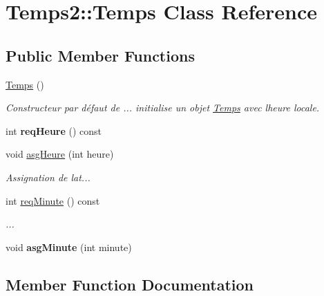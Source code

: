 \hypertarget{classTemps2_1_1Temps}{}\section{Temps2\+:\+:Temps Class Reference}
\label{classTemps2_1_1Temps}
\subsection*{Public Member Functions}
\begin{DoxyCompactItemize}
\item 
\hyperlink{classTemps2_1_1Temps_afa08c90e00b7d4dd11a3b1181cedc5ff}{Temps} ()\hypertarget{classTemps2_1_1Temps_afa08c90e00b7d4dd11a3b1181cedc5ff}{}\label{classTemps2_1_1Temps_afa08c90e00b7d4dd11a3b1181cedc5ff}

\begin{DoxyCompactList}\small\item\em Constructeur par défaut de ... initialise un objet \hyperlink{classTemps2_1_1Temps}{Temps} avec l\textquotesingle{}heure locale. \end{DoxyCompactList}\item 
int {\bfseries req\+Heure} () const \hypertarget{classTemps2_1_1Temps_a58791986c9b433a65c80f95670d343f1}{}\label{classTemps2_1_1Temps_a58791986c9b433a65c80f95670d343f1}

\item 
void \hyperlink{classTemps2_1_1Temps_ab531fcca13f7f57c127c8fa37d638260}{asg\+Heure} (int heure)
\begin{DoxyCompactList}\small\item\em Assignation de l\textquotesingle{}at... \end{DoxyCompactList}\item 
int \hyperlink{classTemps2_1_1Temps_a6bf20b459c37dac7923e2cb2056e83da}{req\+Minute} () const 
\begin{DoxyCompactList}\small\item\em ... \end{DoxyCompactList}\item 
void {\bfseries asg\+Minute} (int minute)\hypertarget{classTemps2_1_1Temps_ab95238cbf2ee4eb7c9a832907d03534d}{}\label{classTemps2_1_1Temps_ab95238cbf2ee4eb7c9a832907d03534d}

\end{DoxyCompactItemize}


\subsection{Member Function Documentation}
